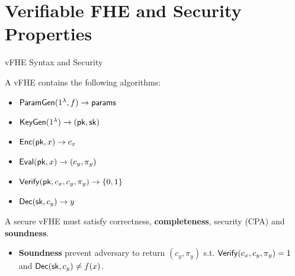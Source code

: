 \section{Verifiable FHE and Security Properties}
\begin{frame}{vFHE Syntax and Security}
	
	A vFHE contains the following algorithms:
	\begin{itemize}
		\item $\mathsf{ParamGen}(1^\lambda, f) \to \mathsf{params}$
		\item $\mathsf{KeyGen}(1^\lambda) \to (\mathsf{pk}, \mathsf{sk})$
		\item $\mathsf{Enc}(\mathsf{pk}, x)\to c_x$
		\item $\mathsf{Eval}(\mathsf{pk}, x)\to (c_y, \pi_y)$
		\item $\mathsf{Verify}(\mathsf{pk}, c_x, c_y, \pi_y)\to \{0,1\}$
		\item $\mathsf{Dec}(\mathsf{sk}, c_y)\to y$
	\end{itemize}
	
	A secure vFHE must satisfy correctness, \textbf{completeness}, security (CPA) and \textbf{soundness}.
	\begin{itemize}
		\item \textbf{Soundness} prevent adversary to return $(c_y, \pi_y)$ s.t. $\mathsf{Verify}(c_x, c_y, \pi_y) = 1$ and $\mathsf{Dec}(\mathsf{sk}, c_y) \not= f(x)$.
	\end{itemize}
\end{frame}